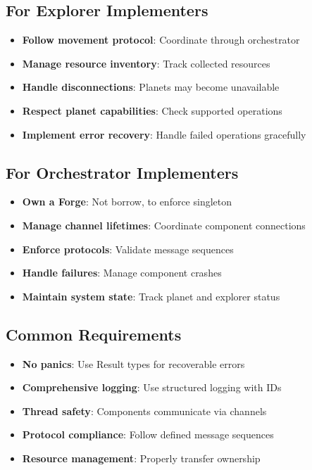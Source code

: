 \documentclass[12pt,a4paper]{article}
\newcommand{\important}[1]{\textbf{\textcolor{accent}{#1}}}
\begin{document}
\subsection{For Explorer Implementers}
\begin{itemize}
    \item \important{Follow movement protocol}: Coordinate through orchestrator
    \item \important{Manage resource inventory}: Track collected resources
    \item \important{Handle disconnections}: Planets may become unavailable
    \item \important{Respect planet capabilities}: Check supported operations
    \item \important{Implement error recovery}: Handle failed operations gracefully
\end{itemize}

\subsection{For Orchestrator Implementers}
\begin{itemize}
    \item \important{Own a Forge}: Not borrow, to enforce singleton
    \item \important{Manage channel lifetimes}: Coordinate component connections
    \item \important{Enforce protocols}: Validate message sequences
    \item \important{Handle failures}: Manage component crashes
    \item \important{Maintain system state}: Track planet and explorer status
\end{itemize}

\newpage

\subsection{Common Requirements}
\begin{itemize}
    \item \important{No panics}: Use Result types for recoverable errors
    \item \important{Comprehensive logging}: Use structured logging with IDs
    \item \important{Thread safety}: Components communicate via channels
    \item \important{Protocol compliance}: Follow defined message sequences
    \item \important{Resource management}: Properly transfer ownership
\end{itemize}
\end{document}
